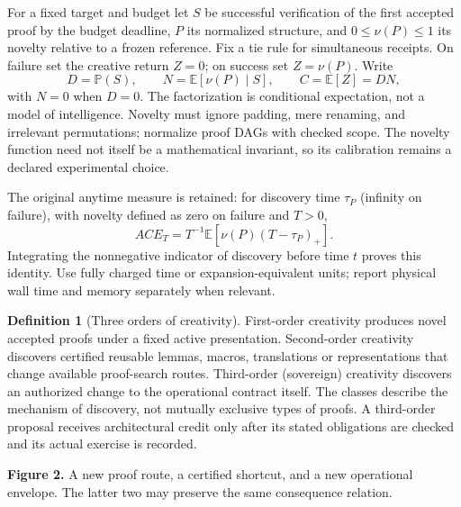 \documentclass[11pt]{article}
\theoremstyle{definition}\newtheorem{definition}[theorem]{Definition}\newtheorem{conjecture}[theorem]{Conjecture}\newtheorem{example}[theorem]{Example}
\newcommand{\E}{\mathbb E}\newcommand{\Prb}{\mathbb P}\newcommand{\N}{\mathbb N}\newcommand{\PC}{\operatorname{PC}}\newcommand{\K}{\mathcal K}\newcommand{\T}{\mathcal T}\newcommand{\F}{\mathcal F}\newcommand{\ind}{\mathbf 1}\newcommand{\cost}{\operatorname{cost}}
\begin{document}
For a fixed target and budget let $S$ be successful verification of the first accepted proof by the budget deadline, $P$ its normalized structure, and $0\leq\nu(P)\leq1$ its novelty relative to a frozen reference. Fix a tie rule for simultaneous receipts. On failure set the creative return $Z=0$; on success set $Z=\nu(P)$. Write
\[
 D=\Prb(S),\qquad N=\E[\nu(P)\mid S],\qquad C=\E[Z]=DN,
\]
with $N=0$ when $D=0$. The factorization is conditional expectation, not a model of intelligence. Novelty must ignore padding, mere renaming, and irrelevant permutations; normalize proof DAGs with checked scope. The novelty function need not itself be a mathematical invariant, so its calibration remains a declared experimental choice.

The original anytime measure is retained: for discovery time $\tau_P$ (infinity on failure), with novelty defined as zero on failure and $T>0$,
\[
 ACE_T=T^{-1}\E[\nu(P)(T-\tau_P)_+].
\]
Integrating the nonnegative indicator of discovery before time $t$ proves this identity. Use fully charged time or expansion-equivalent units; report physical wall time and memory separately when relevant.

\begin{definition}[Three orders of creativity]
First-order creativity produces novel accepted proofs under a fixed active presentation. Second-order creativity discovers certified reusable lemmas, macros, translations or representations that change available proof-search routes. Third-order (sovereign) creativity discovers an authorized change to the operational contract itself. The classes describe the mechanism of discovery, not mutually exclusive types of proofs. A third-order proposal receives architectural credit only after its stated obligations are checked and its actual exercise is recorded.
\end{definition}
\begin{center}
\end{center}
\textbf{Figure 2.} A new proof route, a certified shortcut, and a new operational envelope. The latter two may preserve the same consequence relation.
\end{document}

